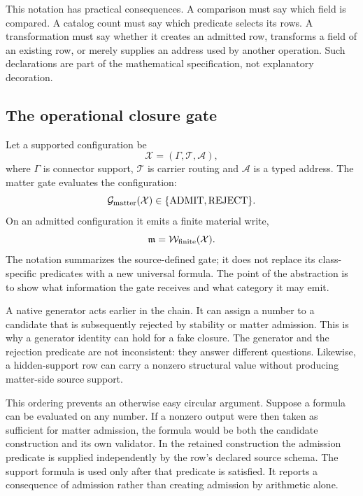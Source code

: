This notation has practical consequences. A comparison must say which field is compared. A catalog count must say which predicate selects its rows. A transformation must say whether it creates an admitted row, transforms a field of an existing row, or merely supplies an address used by another operation. Such declarations are part of the mathematical specification, not explanatory decoration.

\subsection{The operational closure gate}

Let a supported configuration be
\begin{equation}
\mathcal X=(\Gamma,\mathcal T,\mathcal A),
\end{equation}
where $\Gamma$ is connector support, $\mathcal T$ is carrier routing and $\mathcal A$ is a typed address. The matter gate evaluates the configuration:
\begin{equation}
\mathcal G_{\rm matter}(\mathcal X)
\in\{\mathrm{ADMIT},\mathrm{REJECT}\}.
\end{equation}
On an admitted configuration it emits a finite material write,
\begin{equation}
\mathfrak m=\mathcal W_{\rm finite}(\mathcal X).
\end{equation}
The notation summarizes the source-defined gate; it does not replace its class-specific predicates with a new universal formula. The point of the abstraction is to show what information the gate receives and what category it may emit.

A native generator acts earlier in the chain. It can assign a number to a candidate that is subsequently rejected by stability or matter admission. This is why a generator identity can hold for a fake closure. The generator and the rejection predicate are not inconsistent: they answer different questions. Likewise, a hidden-support row can carry a nonzero structural value without producing matter-side source support.

This ordering prevents an otherwise easy circular argument. Suppose a formula can be evaluated on any number. If a nonzero output were then taken as sufficient for matter admission, the formula would be both the candidate construction and its own validator. In the retained construction the admission predicate is supplied independently by the row's declared source schema. The support formula is used only after that predicate is satisfied. It reports a consequence of admission rather than creating admission by arithmetic alone.

